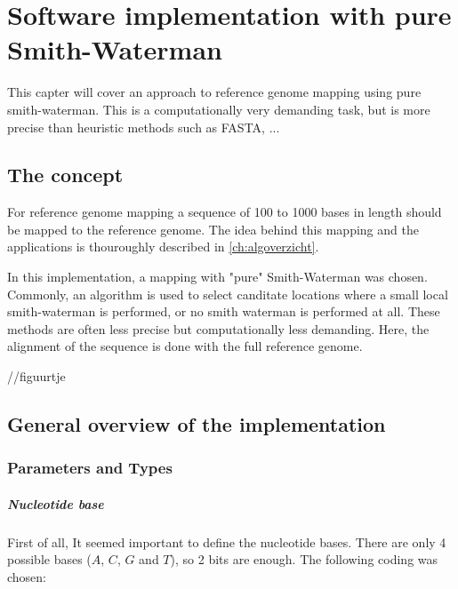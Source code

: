 
\chapter{Software implementation with pure Smith-Waterman}

This capter will cover an approach to reference genome mapping using pure smith-waterman. This is a computationally very demanding task, but is more precise than heuristic methods such as FASTA, ...

\section{The concept}
For reference genome mapping a sequence of 100 to 1000 bases in length should be mapped to the reference genome. The idea behind this mapping and the applications is thouroughly described in \ref{ch:algoverzicht}.

In this implementation, a mapping with "pure" Smith-Waterman was chosen. Commonly, an algorithm is used to select canditate locations where a small local smith-waterman is performed, or no smith waterman is performed at all. These methods are often less precise but computationally less demanding. Here, the alignment of the sequence is done with the full reference genome.

 //figuurtje


\section{General overview of the implementation}

\subsection{Parameters and Types}

\paragraph{Nucleotide base}
First of all, It seemed important to define the nucleotide bases. There are only 4 possible bases ($A$, $C$, $G$ and $T$), so 2 bits are enough. The following coding was chosen:


